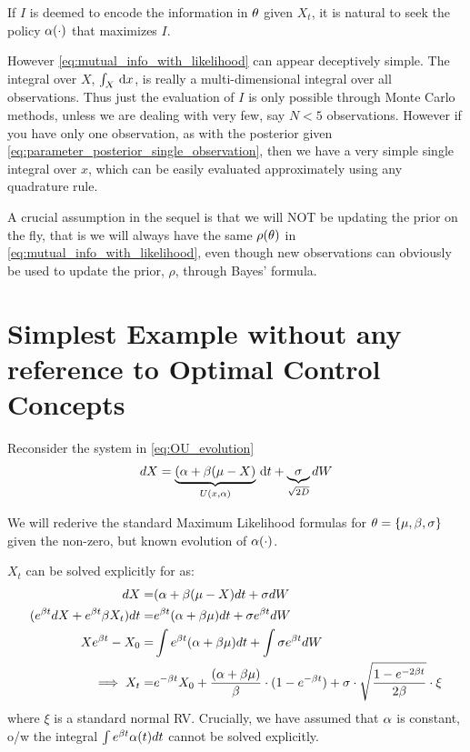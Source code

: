 If $I$ is deemed to encode the information in ${ \theta}$ given $X_t$, it is
natural to seek the policy $\alpha(\cdot)$ that maximizes $I$.

However \cref{eq:mutual_info_with_likelihood} can appear deceptively
simple. The integral over $X$, $\int_X \, \mathrm{d} x$, is really a multi-dimensional integral
over all observations. Thus just the evaluation of $I$ is only possible through
Monte Carlo methods, unless we are dealing with very few, say $N<5$ observations.
However if you have only one observation, as with the posterior given
\cref{eq:parameter_posterior_single_observation}, then we have a very simple
single integral over $x$, which can be easily evaluated approximately using any
quadrature rule.

A crucial assumption in the sequel is that we will NOT be updating the prior on
the fly, that is we will always have the same $\rho({ \theta})$ in
\cref{eq:mutual_info_with_likelihood}, even though new observations can
obviously be used to update the prior, $\rho$, through Bayes' formula.


\section{Simplest Example without any reference to Optimal Control Concepts}

Reconsider the system in \cref{eq:OU_evolution} 
$$
dX = \underbrace{(\alpha + \beta( \mu - X)}_{U(x,\alpha)} \, \mathrm{d} t +
\underbrace{\sigma}_{\sqrt{2D}} dW
$$

We will rederive the standard Maximum Likelihood formulas for ${ \theta} = \{{\mu }, \beta,
\sigma\}$ given the non-zero, but known evolution of $\alpha(\cdot)$.

$X_t$ can be solved explicitly for as:
\begin{align*}
dX =& (\alpha + \beta( \mu - X) dt + \sigma dW
\\
(e^{\beta t} dX + e^{\beta t}\beta X_t) dt
=&
e^{ \beta t}( \alpha + \beta {\mu }) dt + \sigma e^{\beta t} dW
\\
Xe^{\beta t} - X_0 =&
\int e^{ \beta t}( \alpha + \beta {\mu }) dt +  \int \sigma e^{\beta t} dW
\\
\implies
X_t =& e^{-\beta t} X_0 
		+ \frac{(\alpha + \beta {\mu })}{\beta} \cdot ( 1- e^{-\beta t}) +
	       \sigma  \cdot \sqrt\frac{{ 1 - e^{-2\beta t}}}{2\beta} \cdot \xi 
\end{align*}
where $\xi$ is a standard normal RV. Crucially, we have assumed that $\alpha$ is
constant, o/w the integral $\int e^{ \beta t}  \alpha(t) dt$ cannot be solved
explicitly.

